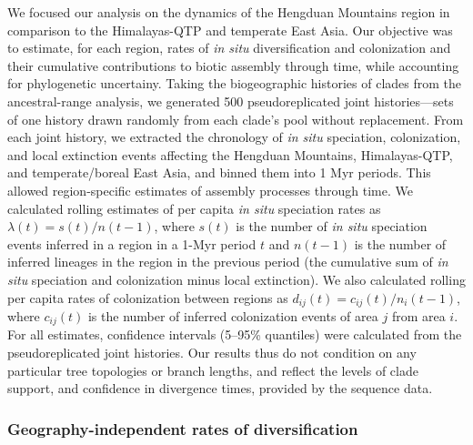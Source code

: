 We focused our analysis on the dynamics of the Hengduan Mountains
region in comparison to the Himalayas-QTP and temperate East Asia. Our
objective was to estimate, for each region, rates of \textit{in situ}
diversification and colonization and their cumulative contributions to
biotic assembly through time, while accounting for phylogenetic
uncertainy. Taking the biogeographic histories of clades from the
ancestral-range analysis, we generated 500 pseudoreplicated joint
histories---sets of one history drawn randomly from each clade's pool
without replacement. From each joint history, we extracted the
chronology of \textit{in situ} speciation, colonization, and local
extinction events affecting the Hengduan Mountains, Himalayas-QTP, and
temperate/boreal East Asia, and binned them into 1 Myr periods. This
allowed region-specific estimates of assembly processes through
time. We calculated rolling estimates of per capita \textit{in situ}
speciation rates as $\lambda(t) = s(t)/n(t-1)$, where $s(t)$ is the
number of \textit{in situ} speciation events inferred in a region in a
1-Myr period $t$ and $n(t-1)$ is the number of inferred lineages in
the region in the previous period (the cumulative sum of \textit{in
  situ} speciation and colonization minus local extinction). We also
calculated rolling per capita rates of colonization between regions as
$d_{ij}(t) = c_{ij}(t)/n_i(t-1)$, where $c_{ij}(t)$ is the number of
inferred colonization events of area $j$ from area $i$. For all
estimates, confidence intervals (5--95\% quantiles) were calculated
from the pseudoreplicated joint histories. Our results thus do not
condition on any particular tree topologies or branch lengths, and
reflect the levels of clade support, and confidence in divergence
times, provided by the sequence data.

\subsubsection*{Geography-independent rates of diversification}

